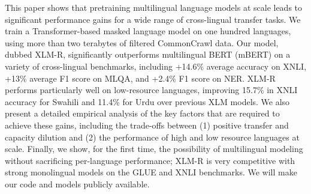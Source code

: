 This paper shows that pretraining  multilingual language models at scale leads to significant performance gains for a wide range of cross-lingual transfer tasks. We train a Transformer-based masked language model on one hundred languages, using more than two terabytes of filtered CommonCrawl data. Our model, dubbed XLM-R, significantly outperforms multilingual BERT (mBERT) on a variety of cross-lingual benchmarks, including +14.6\% average accuracy on XNLI, +13\% average F1 score on MLQA, and +2.4\% F1 score on NER. XLM-R performs particularly well on low-resource languages, improving 15.7\% in XNLI accuracy for Swahili and 11.4\% for Urdu over previous XLM models. We also present a detailed empirical analysis of the key factors that are required to achieve these gains, including the trade-offs between (1) positive transfer and capacity dilution and (2) the performance of high and low resource languages at scale. Finally, we show, for the first time, the possibility of multilingual modeling without sacrificing per-language performance; XLM-R is very competitive with strong monolingual models on the GLUE and XNLI benchmarks. We will make our code and models publicly available.
